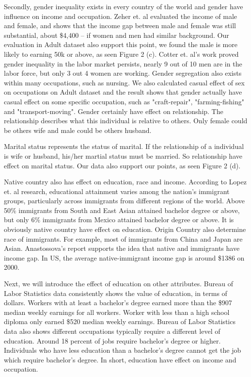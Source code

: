 \documentclass[letterpaper,12pt]{article}
\begin{document}
Secondly, gender inequality exists in every country of the world\cite{kenworthy1999gender} and gender have influence on income and occupation. Zeher et. al\cite{bobbitt2007gender} evaluated the income of male and female, and shows that the income gap between male and female was still substantial, about \$4,400 -- if women and men had similar background. Our evaluation in Adult dataset also support this point, we found the male is more likely to earning 50k or above, as seen Figure 2 (c). Cotter et. al's\cite{cotter2004gender} work proved gender inequality in the labor market persists, nearly 9 out of 10 men are in the labor force, but only 3 out 4 women are working. Gender segregation also exists within many occupations, such as nursing\cite{porter1992women}. We also calculated casual effect of sex on occupations on Adult dataset and the result shows that gender actually have casual effect on some specific occupation, such as "craft-repair", "farming-fishing" and "transport-moving". Gender certainly have effect on relationship. The relationship describes what this individual is relative to others. Only female could be others wife and male could be others husband. \par


Marital status represents the status of marital. If the relationship of a individual is wife or husband, his/her martial status must be married. So relationship have effect on marital status. Our data also support our points, as seen Figure 2 (d).\par

Native country also has effect on education, race and income. According to Lopez et. al\cite{lópez_bialik_radford_lópez_bialik_radford_2018} research, educational attainment varies among the nation’s immigrant groups, particularly across immigrants from different regions of the world. Above 50\% immigrants from South and East Asian attained bachelor degree or above, but only 6\% immigrants from Mexico attained bachelor degree or above. It is obviously native country have effect on education. Origin Country also determine race of immigrants. For example, most of immigrants from China and Japan are Asian. Anastossova's report\cite{Anastossova2006What} supports the idea that native and immigrants have income gap. In US, the average native-immigrant income gap is around \$1386 on 2000. \par

Next, we will introduce the effect of education on other attributes. Bureau of Labor Statistics data\cite{torpey} consistently shows the value of education, in terms of dollars. Workers with at least a bachelor’s degree earned more than the \$907 median weekly earnings for all workers. Worker with less than a high school diploma only earned \$520 median weekly earnings. Bureau of Labor Statistics\cite{torpey_watson} data also shows different occupations typically require a different level of education. Around 18 percent of jobs require bachelor’s degree or higher. Individuals who have less education than a bachelor's degree cannot get the job which require bachelor's degree. In short, education have effect on income and occupation. \par
\end{document}
